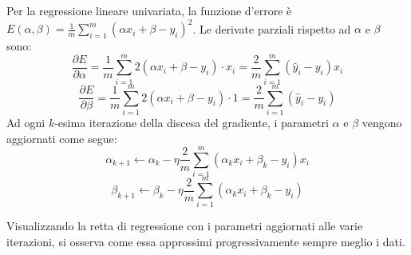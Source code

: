 \documentclass{article}
\begin{document}
Per la regressione lineare univariata, la funzione d'errore è $E(\alpha, \beta) = \frac{1}{m} \sum_{i=1}^{m} (\alpha x_i + \beta - y_i)^2$. Le derivate parziali rispetto ad $\alpha$ e $\beta$ sono:
$$ \frac{\partial E}{\partial \alpha} = \frac{1}{m} \sum_{i=1}^{m} 2 (\alpha x_i + \beta - y_i) \cdot x_i = \frac{2}{m} \sum_{i=1}^{m} (\hat{y}_i - y_i) x_i $$
$$ \frac{\partial E}{\partial \beta} = \frac{1}{m} \sum_{i=1}^{m} 2 (\alpha x_i + \beta - y_i) \cdot 1 = \frac{2}{m} \sum_{i=1}^{m} (\hat{y}_i - y_i) $$
Ad ogni $k$-esima iterazione della discesa del gradiente, i parametri $\alpha$ e $\beta$ vengono aggiornati come segue:
$$ \alpha_{k+1} \leftarrow \alpha_k - \eta \frac{2}{m} \sum_{i=1}^{m} (\alpha_k x_i + \beta_k - y_i) x_i $$
$$ \beta_{k+1} \leftarrow \beta_k - \eta \frac{2}{m} \sum_{i=1}^{m} (\alpha_k x_i + \beta_k - y_i) $$

Visualizzando la retta di regressione con i parametri aggiornati alle varie iterazioni, si osserva come essa approssimi progressivamente sempre meglio i dati.
\end{document}
